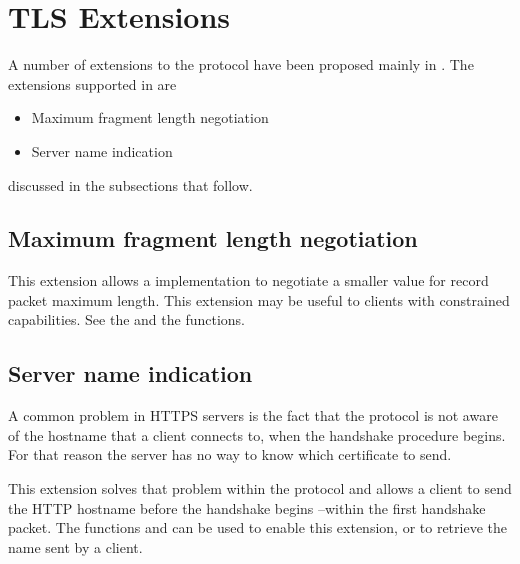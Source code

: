 \section{TLS Extensions}

A number of extensions to the \tls{} protocol have been proposed 
mainly in \cite{TLSEXT}. The extensions supported in \gnutls{} are
\begin{itemize}
\item Maximum fragment length negotiation
\item Server name indication
\end{itemize}
discussed in the subsections that follow.

\subsection*{Maximum fragment length negotiation}

This extension allows a \tlsI{} implementation to negotiate
a smaller value for record packet maximum length. This extension
may be useful to clients with constrained capabilities. See
the 
and the 
functions.

\subsection*{Server name indication}
\label{serverind}

A common problem in HTTPS servers is the fact that the \tls{}
protocol is not aware of the hostname that a client connects to, when
the handshake procedure begins. For that reason the \tls{} server
has no way to know which certificate to send. 

This extension solves that problem within the \tls{} protocol
and allows a client to send the HTTP hostname
before the handshake begins --within the first handshake packet.
The functions 
 and
can be used to enable this extension, or to retrieve the name sent
by a client.

